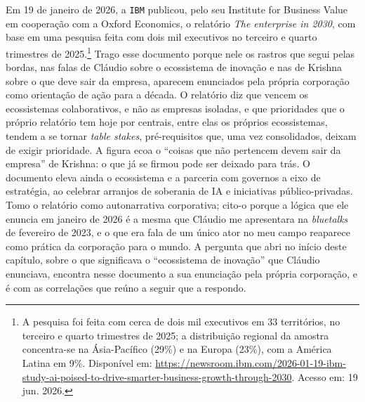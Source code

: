 Em 19 de janeiro de 2026, a \texttt{IBM} publicou, pelo seu Institute for Business Value em cooperação com a Oxford Economics, o relatório \textit{The enterprise in 2030}, com base em uma pesquisa feita com dois mil executivos no terceiro e quarto trimestres de 2025.\footnote{A pesquisa foi feita com cerca de dois mil executivos em 33 territórios, no terceiro e quarto trimestres de 2025; a distribuição regional da amostra concentra-se na Ásia-Pacífico (29\%) e na Europa (23\%), com a América Latina em 9\%. Disponível em: \url{https://newsroom.ibm.com/2026-01-19-ibm-study-ai-poised-to-drive-smarter-business-growth-through-2030}. Acesso em: 19 jun. 2026.} Trago esse documento porque nele os rastros que segui pelas bordas, nas falas de Cláudio sobre o ecossistema de inovação e nas de Krishna sobre o que deve sair da empresa, aparecem enunciados pela própria corporação como orientação de ação para a década. O relatório diz que vencem os ecossistemas colaborativos, e não as empresas isoladas, e que prioridades que o próprio relatório tem hoje por centrais, entre elas os próprios ecossistemas, tendem a se tornar \emph{table stakes}, pré-requisitos que, uma vez consolidados, deixam de exigir prioridade. A figura ecoa o \enquote{coisas que não pertencem devem sair da empresa} de Krishna: o que já se firmou pode ser deixado para trás. O documento eleva ainda o ecossistema e a parceria com governos a eixo de estratégia, ao celebrar arranjos de soberania de IA e iniciativas público-privadas. Tomo o relatório como autonarrativa corporativa; cito-o porque a lógica que ele enuncia em janeiro de 2026 é a mesma que Cláudio me apresentara na \textit{bluetalks} de fevereiro de 2023, e o que era fala de um único ator no meu campo reaparece como prática da corporação para o mundo. A pergunta que abri no início deste capítulo, sobre o que significava o \enquote{ecossistema de inovação} que Cláudio enunciava, encontra nesse documento a sua enunciação pela própria corporação, e é com as correlações que reúno a seguir que a respondo. %

